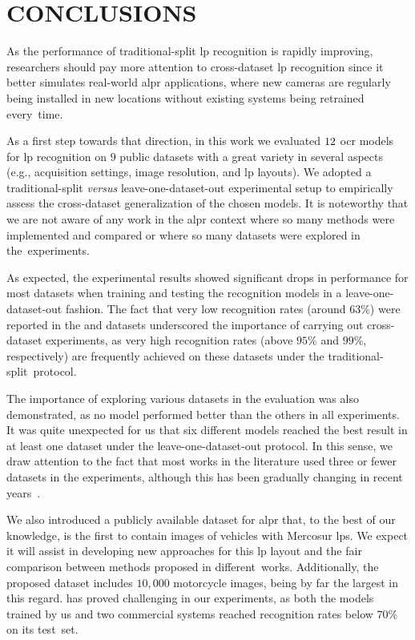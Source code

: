 \section{\uppercase{Conclusions}}
\label{sec:conclusions}

As the performance of traditional-split \gls*{lp} recognition is rapidly improving, researchers should pay more attention to cross-dataset \gls*{lp} recognition since it better simulates real-world \gls*{alpr} applications, where new cameras are regularly being installed in new locations without existing systems being retrained every~time.

As a first step towards that direction, in this work we evaluated $12$ \gls*{ocr} models for \gls*{lp} recognition on $9$ public datasets with a great variety in several aspects (e.g., acquisition settings, image resolution, and \gls*{lp} layouts).
We adopted a traditional-split \textit{versus} leave-one-dataset-out experimental setup to empirically assess the cross-dataset generalization of the chosen models.
It is noteworthy that we are not aware of any work in the \gls*{alpr} context where so many methods were implemented and compared or where so many datasets were explored in the~experiments.

As expected, the experimental results showed significant drops in performance for most datasets when training and testing the recognition models in a leave-one-dataset-out fashion.
The fact that very low recognition rates (around $63$\%) were reported in the \englishlp and \aolp datasets underscored the importance of carrying out cross-dataset experiments, as very high recognition rates (above $95$\% and $99$\%, respectively) are frequently achieved on these datasets under the traditional-split~protocol.

The importance of exploring various datasets in the evaluation was also demonstrated, as no model performed better than the others in all experiments.
It was quite unexpected for us that six different models reached the best result in at least one dataset under the leave-one-dataset-out protocol.
In this sense, we draw attention to the fact that most works in the literature used three or fewer datasets in the experiments, although this has been gradually changing in recent years~\citep{selmi2020delpdar,laroca2021efficient}.

We also introduced a publicly available dataset for \gls*{alpr} that, to the best of our knowledge, is the first to contain images of vehicles with Mercosur \glspl*{lp}.
We expect it will assist in developing new approaches for this \gls*{lp} layout and the fair comparison between methods proposed in different~works.
Additionally, the proposed dataset includes $10{,}000$ motorcycle images, being by far the largest in this regard.
\dataset has proved challenging in our experiments, as both the models trained by us and two commercial systems reached recognition rates below $70$\% on its test~set.

